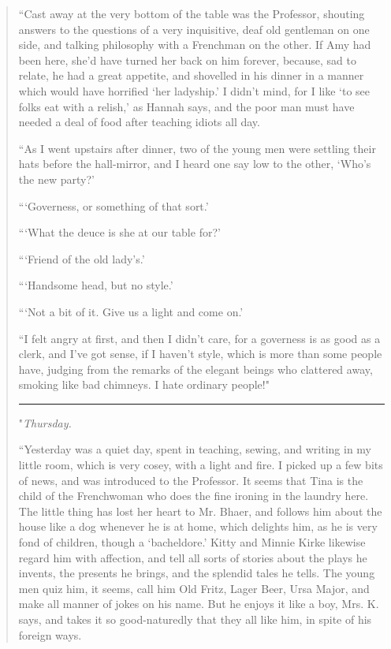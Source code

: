 \begin{quote}
``Cast away at the very bottom of the table was the Professor, shouting
answers to the questions of a very inquisitive, deaf old gentleman on
one side, and talking philosophy with a Frenchman on the other. If Amy
had been here, she'd have turned her back on him
forever, because, sad to relate, he had a great appetite, and shovelled
in his dinner in a manner which would have horrified
`her ladyship.' I
didn't mind, for I like `to see folks
eat with a relish,' as Hannah says, and the poor man
must have needed a deal of food after teaching idiots all day.

``As I went upstairs after dinner, two of the young men were settling
their hats before the hall-mirror, and I heard one say low to the other,
`Who's the new party?'

```Governess, or something of that
sort.'

```What the deuce is she at our table
for?'

```Friend of the old
lady's.'

```Handsome head, but no style.'

```Not a bit of it. Give us a light and come
on.'

``I felt angry at first, and then I didn't care, for a
governess is as good as a clerk, and I've got sense, if
I haven't style, which is more than some people have,
judging from the remarks of the elegant beings who clattered away,
smoking like bad chimneys. I hate ordinary people!"

\begin{center}\rule{0.5\linewidth}{0.5pt}\end{center}

"\emph{Thursday.}

``Yesterday was a quiet day, spent in teaching, sewing, and writing in my
little room, which is very cosey, with a light and fire. I picked up a
few bits of news, and was introduced to the Professor. It seems that
Tina is the child of the Frenchwoman who does the fine ironing in the
laundry here. The little thing has lost her heart to Mr. Bhaer, and
follows him about the house like a dog whenever he is at home, which
delights him, as he is very fond of children, though a
`bacheldore.' Kitty and Minnie Kirke
likewise regard him with affection, and tell all sorts of stories about
the plays he invents, the presents he brings, and the splendid tales he
tells. The young men quiz him, it seems, call him Old Fritz, Lager Beer,
Ursa Major, and make all manner of jokes on his name. But he enjoys it
like a boy, Mrs. K. says, and takes it so good-naturedly that they all
like him, in spite of his foreign ways.


\end{quote}
